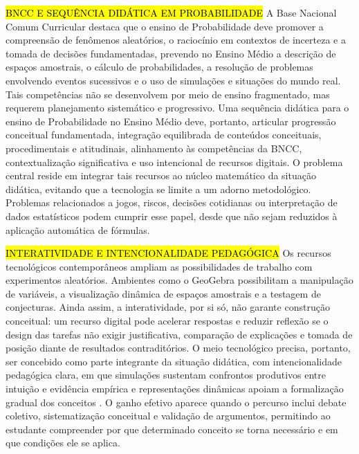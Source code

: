 {\hl{BNCC E SEQUÊNCIA DIDÁTICA EM PROBABILIDADE} A Base Nacional Comum Curricular \cite[p.~520, 523, 528, 531]{brasil2018} destaca que o ensino de Probabilidade deve promover a compreensão de fenômenos aleatórios, o raciocínio em contextos de incerteza e a tomada de decisões fundamentadas, prevendo no Ensino Médio a descrição de espaços amostrais, o cálculo de probabilidades, a resolução de problemas envolvendo eventos sucessivos e o uso de simulações e situações do mundo real. Tais competências não se desenvolvem por meio de ensino fragmentado, mas requerem planejamento sistemático e progressivo. Uma sequência didática para o ensino de Probabilidade no Ensino Médio deve, portanto, articular progressão conceitual fundamentada, integração equilibrada de conteúdos conceituais, procedimentais e atitudinais, alinhamento às competências da BNCC, contextualização significativa e uso intencional de recursos digitais. O problema central reside em integrar tais recursos ao núcleo matemático da situação didática, evitando que a tecnologia se limite a um adorno metodológico. Problemas relacionados a jogos, riscos, decisões cotidianas ou interpretação de dados estatísticos podem cumprir esse papel, desde que não sejam reduzidos à aplicação automática de fórmulas.

\hl {INTERATIVIDADE E INTENCIONALIDADE PEDAGÓGICA} Os recursos tecnológicos contemporâneos ampliam as possibilidades de trabalho com experimentos aleatórios. Ambientes como o GeoGebra possibilitam a manipulação de variáveis, a visualização dinâmica de espaços amostrais e a testagem de conjecturas. Ainda assim, a interatividade, por si só, não garante construção conceitual: um recurso digital pode acelerar respostas e reduzir reflexão se o design das tarefas não exigir justificativa, comparação de explicações e tomada de posição diante de resultados contraditórios. O meio tecnológico precisa, portanto, ser concebido como parte integrante da situação didática, com intencionalidade pedagógica clara, em que simulações sustentam confrontos produtivos entre intuição e evidência empírica e representações dinâmicas apoiam a formalização gradual dos conceitos \cite{trouche2004}. O ganho efetivo aparece quando o percurso inclui debate coletivo, sistematização conceitual e validação de argumentos, permitindo ao estudante compreender por que determinado conceito se torna necessário e em que condições ele se aplica.

}
